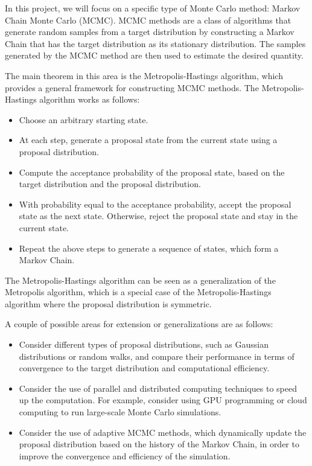 \documentclass{article}
\begin{document}
\vspace{3mm}
In this project, we will focus on a specific type of Monte Carlo method: Markov Chain Monte Carlo (MCMC). MCMC methods are a class of algorithms that generate random samples from a target distribution by constructing a Markov Chain that has the target distribution as its stationary distribution. The samples generated by the MCMC method are then used to estimate the desired quantity.

\vspace{3mm}
The main theorem in this area is the Metropolis-Hastings algorithm, which provides a general framework for constructing MCMC methods. The Metropolis-Hastings algorithm works as follows:
\begin{itemize}
    \item Choose an arbitrary starting state.
    \item At each step, generate a proposal state from the current state using a proposal distribution.
    \item Compute the acceptance probability of the proposal state, based on the target distribution and the proposal distribution.
    \item With probability equal to the acceptance probability, accept the proposal state as the next state. Otherwise, reject the proposal state and stay in the current state.
    \item Repeat the above steps to generate a sequence of states, which form a Markov Chain.
\end{itemize}
The Metropolis-Hastings algorithm can be seen as a generalization of the Metropolis algorithm, which is a special case of the Metropolis-Hastings algorithm where the proposal distribution is symmetric.

\vspace{3mm}
A couple of possible areas for extension or generalizations are as follows:
\begin{itemize}
    \item Consider different types of proposal distributions, such as Gaussian distributions or random walks, and compare their performance in terms of convergence to the target distribution and computational efficiency.
    \item Consider the use of parallel and distributed computing techniques to speed up the computation. For example, consider using GPU programming or cloud computing to run large-scale Monte Carlo simulations.
    \item Consider the use of adaptive MCMC methods, which dynamically update the proposal distribution based on the history of the Markov Chain, in order to improve the convergence and efficiency of the simulation.
\end{itemize}
\end{document}
